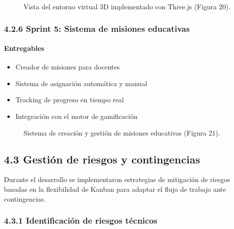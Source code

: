 \begin{figure}[H]
	\centering
	\caption{Vista del entorno virtual 3D implementado con Three.js (Figura 20).}
	\label{fig:3d-environment}
\end{figure}

\subsubsection{4.2.6 Sprint 5: Sistema de misiones educativas}

\paragraph{Entregables}
\begin{itemize}
\item Creador de misiones para docentes
\item Sistema de asignación automática y manual
\item Tracking de progreso en tiempo real
\item Integración con el motor de gamificación
\end{itemize}

\begin{figure}[H]
	\centering
	\caption{Sistema de creación y gestión de misiones educativas (Figura 21).}
	\label{fig:mission-creator}
\end{figure}

\subsection{4.3 Gestión de riesgos y contingencias}

Durante el desarrollo se implementaron estrategias de mitigación de riesgos basadas en la flexibilidad de Kanban para adaptar el flujo de trabajo ante contingencias.

\subsubsection{4.3.1 Identificación de riesgos técnicos}


